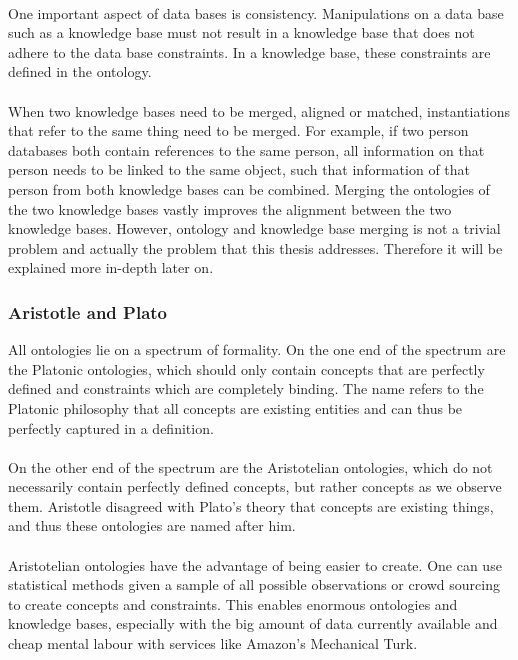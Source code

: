 \documentclass{article}
\begin{document}
 \paragraph{}
 One important aspect of data bases is consistency. Manipulations on a data base such as a knowledge base must not result in a knowledge base that does not adhere to the data base constraints. In a knowledge base, these constraints are defined in the ontology.
 \paragraph{}
 When two knowledge bases need to be merged, aligned or matched, instantiations that refer to the same thing need to be merged. For example, if two person databases both contain references to the same person, all information on that person needs to be linked to the same object, such that information of that person from both knowledge bases can be combined. Merging the ontologies of the two knowledge bases vastly improves the alignment between the two knowledge bases. However, ontology and knowledge base merging is not a trivial problem and actually the problem that this thesis addresses. Therefore it will be explained more in-depth later on\cite{09ontology}.
 \subsubsection{Aristotle and Plato}
 All ontologies lie on a spectrum of formality. On the one end of the spectrum are the Platonic ontologies, which should only contain concepts that are perfectly defined and constraints which are completely binding. The name refers to the Platonic philosophy that all concepts are existing entities and can thus be perfectly captured in a definition.
 \paragraph{}
 On the other end of the spectrum are the Aristotelian ontologies, which do not necessarily contain perfectly defined concepts, but rather concepts as we observe them. Aristotle disagreed with Plato's theory that concepts are existing things, and thus these ontologies are named after him\cite{aristotleplato}.
 \paragraph{}
 Aristotelian ontologies have the advantage of being easier to create. One can use statistical methods given a sample of all possible observations or crowd sourcing to create concepts and constraints. This enables enormous ontologies and knowledge bases, especially with the big amount of data currently available and cheap mental labour with services like Amazon's Mechanical Turk.
\end{document}
